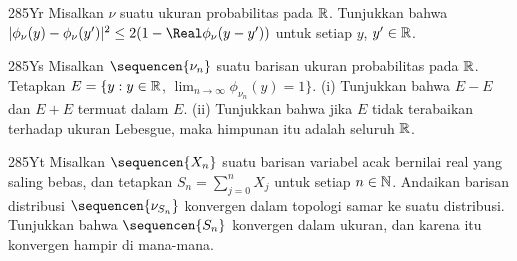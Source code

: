 {\spheader 285Yr Misalkan $\nu$ suatu ukuran probabilitas pada
$\Bbb R$. Tunjukkan bahwa
$|\phi_{\nu}(y)-\phi_{\nu}(y')|^2\le 2(1-\Real\phi_{\nu}(y-y'))$ untuk setiap
$y$, $y'\in\Bbb R$.

\spheader 285Ys Misalkan $\sequencen{\nu_n}$ suatu barisan ukuran
probabilitas pada $\Bbb R$. Tetapkan $E=\{y:y\in\Bbb R$,
$\lim_{n\to\infty}\phi_{\nu_n}(y)=1\}$. (i) Tunjukkan bahwa $E-E$ dan
$E+E$ termuat dalam $E$. (ii) Tunjukkan bahwa jika $E$ tidak terabaikan
terhadap ukuran Lebesgue, maka himpunan itu adalah seluruh $\Bbb R$.

\spheader 285Yt
Misalkan $\sequencen{X_n}$ suatu barisan variabel acak bernilai real yang saling
bebas, dan tetapkan $S_n=\sum_{j=0}^nX_j$ untuk setiap $n\in\Bbb N$.
Andaikan barisan distribusi $\sequencen{\nu_{S_n}}$ konvergen dalam topologi
samar ke suatu distribusi. Tunjukkan bahwa $\sequencen{S_n}$ konvergen dalam
ukuran, dan karena itu konvergen hampir di mana-mana.
}%

